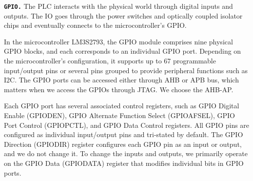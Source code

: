 %
%
%
%






\textbf{\texttt{GPIO.}} The PLC interacts with the physical world through digital inputs and outputs. The IO goes through the power switches and optically coupled isolator chips and eventually connects to the microcontroller's GPIO.


In the microcontroller LM3S2793, the GPIO module comprises nine physical GPIO blocks, and each corresponds to an individual GPIO port. Depending on the microcontroller's configuration, it supports up to 67 programmable input/output pins or several pins grouped to provide peripheral functions such as I2C. The GPIO ports can be accessed either through AHB or APB bus, which matters when we access the GPIOs through JTAG. We choose the AHB-AP.

Each GPIO port has several associated control registers, such as GPIO Digital Enable (GPIODEN), GPIO Alternate Function Select (GPIOAFSEL), GPIO Port Control (GPIOPCTL), and GPIO Data Control registers. All GPIO pins are configured as individual input/output pins and tri-stated by default. The GPIO Direction (GPIODIR) register configures each GPIO pin as an input or output, and we do not change it. To change the inputs and outputs, we primarily operate on the GPIO Data (GPIODATA) register that modifies individual bits in GPIO ports. 

